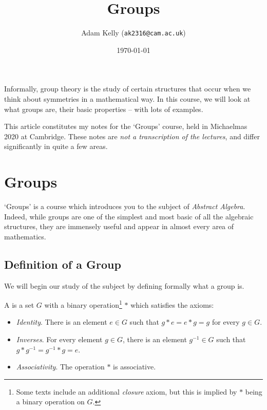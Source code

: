 \documentclass[a4paper]{scrartcl}
\title{Groups}
\author{Adam Kelly (\texttt{ak2316@cam.ac.uk})}
\date{\today}
\begin{document}
\maketitle

Informally, group theory is the study of certain structures that occur when we think about symmetries in a mathematical way.  In this course, we will look at what groups are, their basic properties -- with lots of examples.

This article constitutes my notes for the `Groups' course, held in Michaelmas 2020 at Cambridge. These notes are \emph{not a transcription of the lectures}, and differ significantly in quite a few areas.

\tableofcontents



\section{Groups}

`Groups' is a course which introduces you to the subject of \emph{Abstract Algebra}.
Indeed, while groups are one of the simplest and most basic of all the algebraic structures, they are immensely useful and appear in almost every area of mathematics. 

\subsection{Definition of a Group}

We will begin our study of the subject by defining formally what a group is.

\begin{definition}[Group]
	A  is a set $G$ with a binary operation\footnote{Some texts include an additional \emph{closure} axiom, but this is implied by $*$ being a binary operation on $G$.} $*$ which satisfies the axioms:
	\begin{itemize}
		\item \emph{Identity}. There is an element $e \in G$ such that $g * e = e * g = g$ for every $g \in G$.
		\item \emph{Inverses}. For every element $g \in G$, there is an element $g^{-1} \in G$ such that $g * g^{-1} = g^{-1} * g = e$.
		\item \emph{Associativity}. The operation $*$ is associative.
	\end{itemize}
\end{definition}
\end{document}
